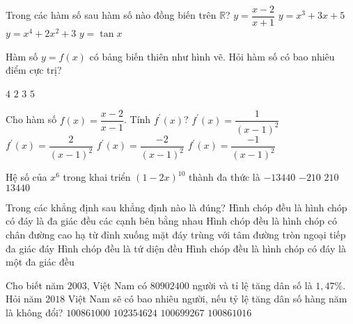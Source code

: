 \begin{ex}%
Trong các hàm số sau hàm số nào đồng biến trên $\mathbb{R}$?
\choice
{$y=\dfrac{x-2}{x+1}$}
{\True $y=x^3+3x+5$}
{$y=x^4+2x^2+3$}
{$y=\tan x$}
\end{ex}

\begin{ex}%
Hàm số $y=f(x)$ có bảng biến thiên như hình vẽ. Hỏi hàm số có bao nhiêu điểm cực trị?\\
\choice
{$4$}
{$2$}
{\True $3$}
{$5$}
\end{ex}

\begin{ex}%
Cho hàm số $f(x)=\dfrac{x-2}{x-1}$. Tính $f^\prime (x)$?
\choice
{\True $f^\prime (x)=\dfrac{1}{(x-1)^2}$}
{$f^\prime (x)=\dfrac{2}{(x-1)^2}$}
{$f^\prime (x)=\dfrac{-2}{(x-1)^2}$}
{$f^\prime (x)=\dfrac{-1}{(x-1)^2}$}
\end{ex}

\begin{ex}%
Hệ số của $x^6$ trong khai triển $(1-2x)^{10}$ thành đa thức là
\choice
{$-13440$}
{$-210$}
{$210$}
{\True $13440$}
\end{ex}

\begin{ex}%
Trong các khẳng định sau khẳng định nào là đúng?
\choice
{\True Hình chóp đều là hình chóp có đáy là đa giác đều các cạnh bên bằng nhau}
{Hình chóp đều là hình chóp có chân đường cao hạ từ đỉnh xuống mặt đáy trùng với tâm đường tròn ngoại tiếp đa giác đáy}
{Hình chóp đều là tứ diện đều}
{Hình chóp đều là hình chóp có đáy là một đa giác đều}
\end{ex}

\begin{ex}%
Cho biết năm $2003$, Việt Nam có $80902400$ người và tỉ lệ tăng dân số là $1,47\%$. Hỏi năm $2018$ Việt Nam sẽ có bao nhiêu người, nếu tỷ lệ tăng dân số hàng năm là không đổi?
\choice
{$100861000$}
{$102354624$}
{\True $100699267$}
{$100861016$}
\end{ex}

